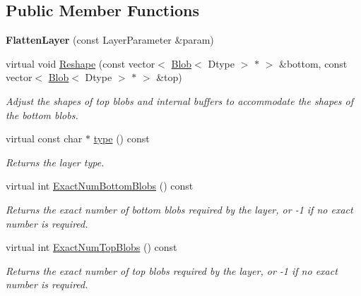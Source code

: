 \subsection*{Public Member Functions}
\begin{DoxyCompactItemize}
\item 
{\bfseries Flatten\+Layer} (const Layer\+Parameter \&param)\hypertarget{classcaffe_1_1FlattenLayer_a7ab62567c2fb5424979dc16af273b688}{}\label{classcaffe_1_1FlattenLayer_a7ab62567c2fb5424979dc16af273b688}

\item 
virtual void \hyperlink{classcaffe_1_1FlattenLayer_a1320de156fb152009c13892e30cc87ef}{Reshape} (const vector$<$ \hyperlink{classcaffe_1_1Blob}{Blob}$<$ Dtype $>$ $\ast$ $>$ \&bottom, const vector$<$ \hyperlink{classcaffe_1_1Blob}{Blob}$<$ Dtype $>$ $\ast$ $>$ \&top)
\begin{DoxyCompactList}\small\item\em Adjust the shapes of top blobs and internal buffers to accommodate the shapes of the bottom blobs. \end{DoxyCompactList}\item 
virtual const char $\ast$ \hyperlink{classcaffe_1_1FlattenLayer_a64027633603db57635c844e2c2421d95}{type} () const \hypertarget{classcaffe_1_1FlattenLayer_a64027633603db57635c844e2c2421d95}{}\label{classcaffe_1_1FlattenLayer_a64027633603db57635c844e2c2421d95}

\begin{DoxyCompactList}\small\item\em Returns the layer type. \end{DoxyCompactList}\item 
virtual int \hyperlink{classcaffe_1_1FlattenLayer_ad7abb8ccc06c7943e79d77bf5a7e2521}{Exact\+Num\+Bottom\+Blobs} () const 
\begin{DoxyCompactList}\small\item\em Returns the exact number of bottom blobs required by the layer, or -\/1 if no exact number is required. \end{DoxyCompactList}\item 
virtual int \hyperlink{classcaffe_1_1FlattenLayer_ab54601497218724036abfcec46a718de}{Exact\+Num\+Top\+Blobs} () const 
\begin{DoxyCompactList}\small\item\em Returns the exact number of top blobs required by the layer, or -\/1 if no exact number is required. \end{DoxyCompactList}\end{DoxyCompactItemize}
